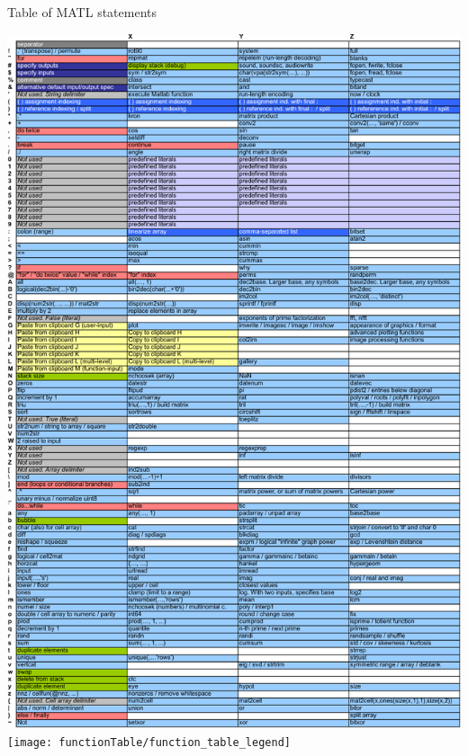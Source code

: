 \documentclass[12pt]{article}
\begin{document}
\begin{table}
\centering%
\caption{Table of MATL statements}
\vspace*{-.1cm}
\includegraphics[scale=.82, clip]{functionTable/function_table}\\[5mm]%
\hspace{3mm}\texttt{[image: functionTable/function\_table\_legend]}%
\label{tab: function table}%
\end{table}
\end{document}
